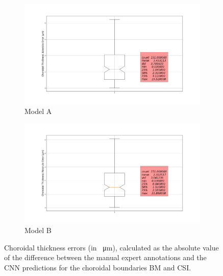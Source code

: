 \documentclass[12pt,a4paper]{scrartcl}
\begin{document}
\begin{figure}[H]
\centering
\begin{subfigure}{1\textwidth}
  \centering
  \includegraphics[width=\linewidth]{./results/A_boxplot_Absolute_Error_choroid.png}
  \caption{Model A}
  \label{fig:boxplot_a_choroidal_thickness}
\end{subfigure}
\begin{subfigure}{1\textwidth}
  \centering
  \includegraphics[width=\linewidth]{./results/B_boxplot_Absolute_Error_choroid.png}
  \caption{Model B}
  \label{fig:boxplot_b_choroidal_thickness}
\end{subfigure}
\caption{Choroidal thickness errors (in \SI{}{\micro\metre}), calculated as the absolute value of the difference between the manual expert annotations and the CNN predictions for the choroidal boundaries BM and CSI.}
\label{fig:choroidal_thickness_boxplots}
\end{figure}
\end{document}
